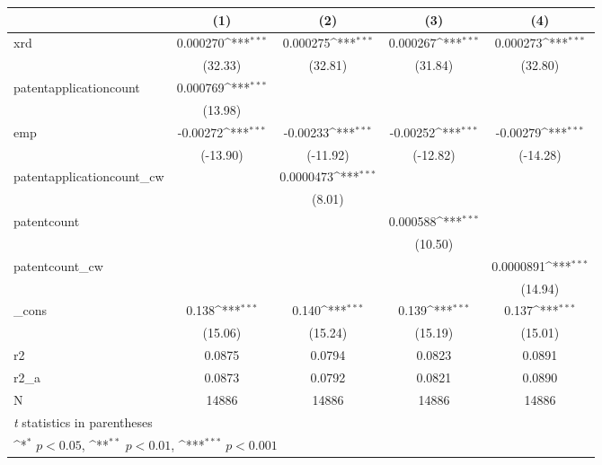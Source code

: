 {
\def\sym#1{\ifmmode^{#1}\else\(^{#1}\)\fi}
\begin{tabular}{l*{4}{c}}
\hline\hline
            &\multicolumn{1}{c}{(1)}         &\multicolumn{1}{c}{(2)}         &\multicolumn{1}{c}{(3)}         &\multicolumn{1}{c}{(4)}         \\
\hline
xrd         &    0.000270\sym{***}&    0.000275\sym{***}&    0.000267\sym{***}&    0.000273\sym{***}\\
            &     (32.33)         &     (32.81)         &     (31.84)         &     (32.80)         \\
[1em]
patentapplicationcount&    0.000769\sym{***}&                     &                     &                     \\
            &     (13.98)         &                     &                     &                     \\
[1em]
emp         &    -0.00272\sym{***}&    -0.00233\sym{***}&    -0.00252\sym{***}&    -0.00279\sym{***}\\
            &    (-13.90)         &    (-11.92)         &    (-12.82)         &    (-14.28)         \\
[1em]
patentapplicationcount\_cw&                     &   0.0000473\sym{***}&                     &                     \\
            &                     &      (8.01)         &                     &                     \\
[1em]
patentcount &                     &                     &    0.000588\sym{***}&                     \\
            &                     &                     &     (10.50)         &                     \\
[1em]
patentcount\_cw&                     &                     &                     &   0.0000891\sym{***}\\
            &                     &                     &                     &     (14.94)         \\
[1em]
\_cons      &       0.138\sym{***}&       0.140\sym{***}&       0.139\sym{***}&       0.137\sym{***}\\
            &     (15.06)         &     (15.24)         &     (15.19)         &     (15.01)         \\
\hline
r2          &      0.0875         &      0.0794         &      0.0823         &      0.0891         \\
r2\_a        &      0.0873         &      0.0792         &      0.0821         &      0.0890         \\
N           &       14886         &       14886         &       14886         &       14886         \\
\hline\hline
\multicolumn{5}{l}{\footnotesize \textit{t} statistics in parentheses}\\
\multicolumn{5}{l}{\footnotesize \sym{*} \(p<0.05\), \sym{**} \(p<0.01\), \sym{***} \(p<0.001\)}\\
\end{tabular}
}
